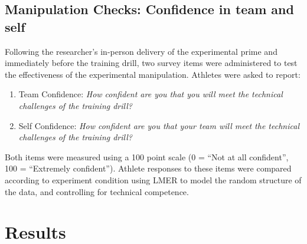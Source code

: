 \begin{CJK}{UTF8}{gbsn}


\subsection{Manipulation Checks: Confidence in team and self \label{sec:manChecksDrill}}
Following the researcher's in-person delivery of the experimental prime and immediately before the training drill, two survey items were administered to test the effectiveness of the experimental manipulation.  Athletes were asked to report:

\begin{enumerate}
  \item Team Confidence: \textit{How confident are you that you will meet the technical challenges of the training drill?}
  \item Self Confidence: \textit{How confident are you that your team will meet the technical challenges of the training drill?}
\end{enumerate}

Both items were measured using a 100 point scale (0 = ``Not at all confident'', 100 = ``Extremely confident'').  Athlete responses to these items were compared according to experiment condition using LMER to model the random structure of the data, and controlling for technical competence.


































\clearpage
\section{Results}



\end{CJK}

